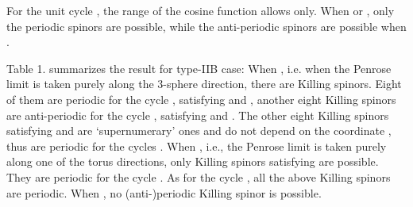 \documentclass[a4paper,12pt]{article}
\begin{document}
For the unit cycle \coordHE{}, the range of the cosine function allows \coordHE{} only. When \coordHE{} or \myHighlight{$\cos{\alpha}=\xi$}\coordHE{}, only the periodic spinors are possible, while the anti-periodic spinors are possible when \myHighlight{$\cos{\alpha}=-\xi$}\coordHE{}. 

Table 1. summarizes the result for type-IIB case: When \coordHE{}, i.e. when the Penrose limit is taken purely along the 3-sphere direction, there are \coordHE{} Killing spinors. Eight of them are periodic for the cycle \coordHE{}, satisfying \coordHE{} and \coordHE{}, another eight Killing spinors are anti-periodic for the cycle \coordHE{}, satisfying \coordHE{} and \coordHE{}. The other eight Killing spinors satisfying \coordHE{} and \coordHE{} are `supernumerary' ones and do not depend on the coordinate \coordHE{}, thus are periodic for the cycles \coordHE{}. When \coordHE{}, i.e., the Penrose limit is taken purely along one of the torus directions, only \coordHE{} Killing spinors satisfying \coordHE{} are possible. They are periodic for the cycle \coordHE{}. As for the cycle \coordHE{}, all the above Killing spinors are periodic. When \coordHE{}, no (anti-)periodic Killing spinor is possible. 
\end{document}
